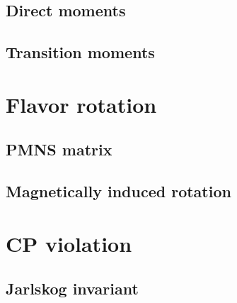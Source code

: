 \documentclass[a4paper]{report}
\begin{document}
        \subsection{Direct moments}
        \subsection{Transition moments}
    \section{Flavor rotation}
        \subsection{PMNS matrix}
        \subsection{Magnetically induced rotation}
    \section{CP violation}
        \subsection{Jarlskog invariant}
\end{document}
